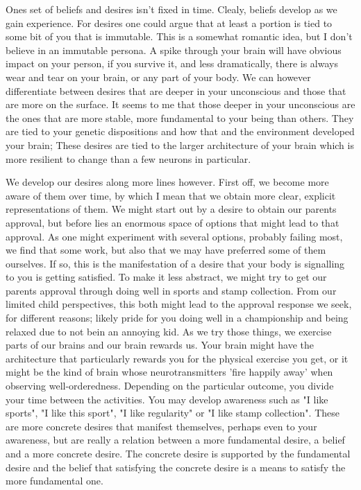 Ones set of beliefs and desires isn't fixed in time. Clealy, beliefs develop as we gain experience. For desires one could argue that at least a portion is tied to some bit of you that is immutable. This is a somewhat romantic idea, but I don't believe in an immutable persona. A spike through your brain will have obvious impact on your person, if you survive it, and less dramatically, there is always wear and tear on your brain, or any part of your body. We can however differentiate between desires that are deeper in your unconscious and those that are more on the surface. It seems to me that those deeper in your unconscious are the ones that are more stable, more fundamental to your being than others. They are tied to your genetic dispositions and how that and the environment developed your brain; These desires are tied to the larger architecture of your brain which is more resilient to change than a few neurons in particular.

We develop our desires along more lines however. First off, we become more aware of them over time, by which I mean that we obtain more clear, explicit representations of them. We might start out by a desire to obtain our parents approval, but before lies an enormous space of options that might lead to that approval. As one might experiment with several options, probably failing most, we find that some work, but also that we may have preferred some of them ourselves. If so, this is the manifestation of a desire that your body is signalling to you is getting satisfied. To make it less abstract, we might try to get our parents approval through doing well in sports and stamp collection. From our limited child perspectives, this both might lead to the approval response we seek, for different reasons; likely pride for you doing well in a championship and being relaxed due to not bein an annoying kid. As we try those things, we exercise parts of our brains and our brain rewards us. Your brain might have the architecture that particularly rewards you for the physical exercise you get, or it might be the kind of brain whose neurotransmitters 'fire happily away' when observing well-orderedness. Depending on the particular outcome, you divide your time between the activities. You may develop awareness such as "I like sports", "I like this sport", "I like regularity" or "I like stamp collection". These are more concrete desires that manifest themselves, perhaps even to your awareness, but are really a relation between a more fundamental desire, a belief and a more concrete desire. The concrete desire is supported by the fundamental desire and the belief that satisfying the concrete desire is a means to satisfy the more fundamental one.

